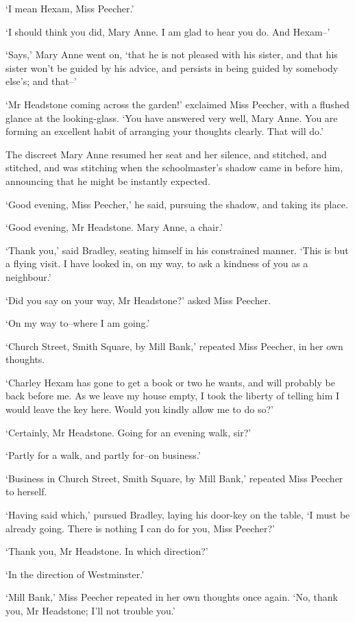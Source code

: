 ‘I mean Hexam, Miss Peecher.’

‘I should think you did, Mary Anne. I am glad to hear you do. And
Hexam--’

‘Says,’ Mary Anne went on, ‘that he is not pleased with his sister, and
that his sister won’t be guided by his advice, and persists in being
guided by somebody else’s; and that--’

‘Mr Headstone coming across the garden!’ exclaimed Miss Peecher, with a
flushed glance at the looking-glass. ‘You have answered very well, Mary
Anne. You are forming an excellent habit of arranging your thoughts
clearly. That will do.’

The discreet Mary Anne resumed her seat and her silence, and stitched,
and stitched, and was stitching when the schoolmaster’s shadow came in
before him, announcing that he might be instantly expected.

‘Good evening, Miss Peecher,’ he said, pursuing the shadow, and taking
its place.

‘Good evening, Mr Headstone. Mary Anne, a chair.’

‘Thank you,’ said Bradley, seating himself in his constrained manner.
‘This is but a flying visit. I have looked in, on my way, to ask a
kindness of you as a neighbour.’

‘Did you say on your way, Mr Headstone?’ asked Miss Peecher.

‘On my way to--where I am going.’

‘Church Street, Smith Square, by Mill Bank,’ repeated Miss Peecher, in
her own thoughts.

‘Charley Hexam has gone to get a book or two he wants, and will probably
be back before me. As we leave my house empty, I took the liberty of
telling him I would leave the key here. Would you kindly allow me to do
so?’

‘Certainly, Mr Headstone. Going for an evening walk, sir?’

‘Partly for a walk, and partly for--on business.’

‘Business in Church Street, Smith Square, by Mill Bank,’ repeated Miss
Peecher to herself.

‘Having said which,’ pursued Bradley, laying his door-key on the table,
‘I must be already going. There is nothing I can do for you, Miss
Peecher?’

‘Thank you, Mr Headstone. In which direction?’

‘In the direction of Westminster.’

‘Mill Bank,’ Miss Peecher repeated in her own thoughts once again. ‘No,
thank you, Mr Headstone; I’ll not trouble you.’

